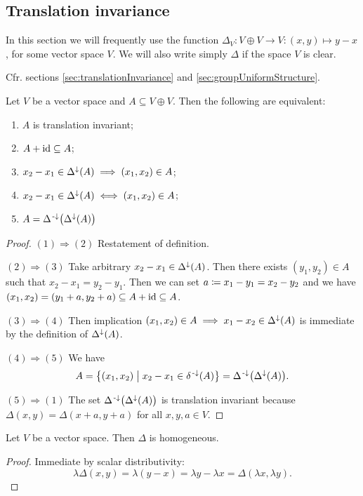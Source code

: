 \subsection{Translation invariance}
In this section we will frequently use the function $\Delta_V: V\oplus V\to V: (x,y) \mapsto y-x$, for some vector space $V$. We will also write simply $\Delta$ if the space $V$ is clear.

Cfr. sections \ref{sec:translationInvariance} and \ref{sec:groupUniformStructure}.

\begin{lemma} \label{vectorspaceTranslationInvariantSubset}
Let $V$ be a vector space and $A\subseteq V\oplus V$. Then the following are equivalent:
\begin{enumerate}
\item $A$ is translation invariant;
\item $A+\operatorname{id} \subseteq A$;
\item $x_2 - x_1\in \Delta^\downarrow(A) \implies (x_1, x_2)\in A$;
\item $x_2 - x_1\in \Delta^\downarrow(A) \iff (x_1, x_2)\in A$;
\item $A = \Delta^{{\text{\hspace{0.15em}-}\downarrow}}\big(\Delta^\downarrow(A)\big)$
\end{enumerate}
\end{lemma}
\begin{proof}
$\boxed{(1) \Rightarrow (2)}$ Restatement of definition.

$\boxed{(2) \Rightarrow (3)}$ Take arbitrary $x_2 - x_1\in \Delta^\downarrow(A)$. Then there exists $(y_1,y_2)\in A$ such that $x_2 - x_1 = y_2 - y_1$. Then we can set $a \coloneqq x_1 - y_1 = x_2 - y_2$ and we have $(x_1, x_2) = (y_1 + a, y_2 + a) \subseteq A+\operatorname{id} \subseteq A$.

$\boxed{(3) \Rightarrow (4)}$ Then implication $(x_1, x_2)\in A \implies x_1 - x_2\in \Delta^\downarrow(A)$ is immediate by the definition of $\Delta^\downarrow(A)$.

$\boxed{(4) \Rightarrow (5)}$ We have
\[ A = \setbuilder{(x_1, x_2)}{x_2-x_1 \in \delta^{\preimf}(A)} = \Delta^\preimf\big(\Delta^\imf(A)\big). \]

$\boxed{(5) \Rightarrow (1)}$ The set $\Delta^{{\text{\hspace{0.15em}-}\downarrow}}\big(\Delta^\downarrow(A)\big)$ is translation invariant because $\Delta(x,y) = \Delta(x+a,y+a)$ for all $x,y,a\in V$.
\end{proof}

\begin{lemma}
Let $V$ be a vector space. Then $\Delta$ is homogeneous.
\end{lemma}
\begin{proof}
Immediate by scalar distributivity:
\[ \lambda\Delta(x,y) = \lambda(y-x) = \lambda y - \lambda x = \Delta(\lambda x, \lambda y). \]
\end{proof}

